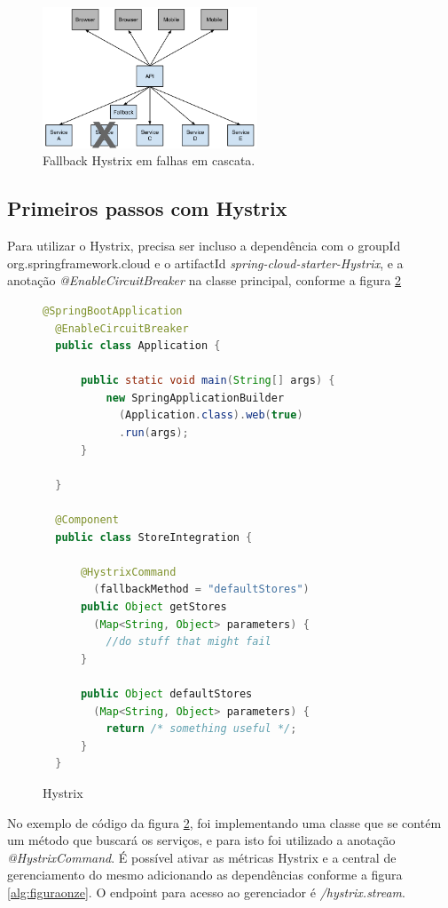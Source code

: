 \documentclass[journal]{IEEEtran}
\begin{document}
\begin{figure}[h]
\centering
\includegraphics[height=4.2cm]{figura7}
\caption{Fallback Hystrix em falhas em cascata.}
\label{fig:figura7}
\end{figure}

\subsection{Primeiros passos com Hystrix}

Para utilizar o Hystrix, precisa ser incluso a dependência com o groupId org.springframework.cloud e o artifactId \emph{spring-cloud-starter-Hystrix}, e a anotação \emph{@EnableCircuitBreaker} na classe principal, conforme a figura \ref{alg:figuradez}

\begin{figure}[h]
\centering

\begin{lstlisting}[language=Java]
  @SpringBootApplication
  @EnableCircuitBreaker
  public class Application {

      public static void main(String[] args) {
          new SpringApplicationBuilder
            (Application.class).web(true)
            .run(args);
      }

  }

  @Component
  public class StoreIntegration {

      @HystrixCommand
        (fallbackMethod = "defaultStores")
      public Object getStores
        (Map<String, Object> parameters) {
          //do stuff that might fail
      }

      public Object defaultStores
        (Map<String, Object> parameters) {
          return /* something useful */;
      }
  }
\end{lstlisting}

\caption{Hystrix}
\label{alg:figuradez}
\end{figure}

No exemplo de código da figura \ref{alg:figuradez}, foi implementando uma classe que se contém um método que buscará os serviços, e para isto foi utilizado a anotação \emph{@HystrixCommand}. É possível ativar as métricas Hystrix e a central de gerenciamento do mesmo adicionando as dependências conforme a figura \ref{alg:figuraonze}. O endpoint para acesso ao gerenciador é \emph{/hystrix.stream}.
\end{document}
